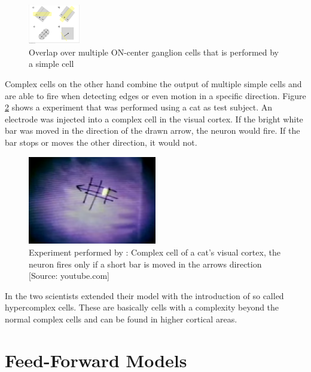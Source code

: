 			\begin{figure}[H]
				\centering
				\captionsetup{justification=centering,margin=1cm}
				\includegraphics[width=0.2\textwidth, trim=6.9cm 2cm 21.4cm 17cm, clip]{images/Simple_and_Complex_Cells.pdf}
				\caption[https://en.wikipedia.org/wiki/File:Simple\_and\_Complex\_Cells.pdf]{Overlap over multiple ON-center ganglion cells that is performed by a simple cell}
				\label{simple-cell}
			\end{figure}
			
			Complex cells on the other hand combine the output of multiple simple cells and are able to fire when detecting edges or even motion in a specific direction. Figure \ref{hubel-exp} shows a experiment that was performed using a cat as test subject. An electrode was injected into a complex cell in the visual cortex. If the bright white bar was moved in the direction of the drawn arrow, the neuron would fire. If the bar stops or moves the other direction, it would not.
			
			\begin{figure}[H]
				\centering
				\captionsetup{justification=centering,margin=1cm}
				\includegraphics[width=0.5\textwidth]{images/hubel-experiment.png}
				\caption{Experiment performed by \citeauthor{hubel1962receptive}: Complex cell of a cat's visual cortex, the neuron fires only if a short bar is moved in the arrows direction [Source: youtube.com]}
				\label{hubel-exp}
			\end{figure}
			
			In \citep{hubel1965receptive} the two scientists extended their model with the introduction of so called hypercomplex cells. These are basically cells with a complexity beyond the normal complex cells and can be found in higher cortical areas.
			
	\section{Feed-Forward Models}
		
